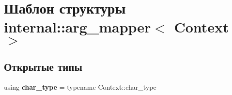 \hypertarget{structinternal_1_1arg__mapper}{}\section{Шаблон структуры internal\+:\+:arg\+\_\+mapper$<$ Context $>$}
\label{structinternal_1_1arg__mapper}
\subsection*{Открытые типы}
\begin{DoxyCompactItemize}
\item 
\mbox{\label{structinternal_1_1arg__mapper_a01a4c50af3c9c53a284be539c3453783}} 
using {\bfseries char\+\_\+type} = typename Context\+::char\+\_\+type
\end{DoxyCompactItemize}
